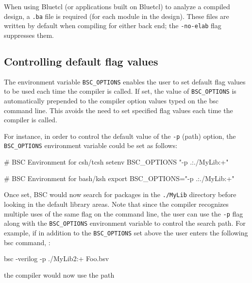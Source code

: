 \documentclass{article}
\newcommand{\te}[1]{\texttt{#1}}
\newenvironment{centerboxverbatim}
  {\center
   \boxedverbatim}
  {\endboxedverbatim
  {\endcenter }}
\begin{document}
When using Bluetcl (or applications built on Bluetcl) to analyze a compiled
design, a \te{.ba} file is required (for each module in the design).
These files are written by default when compiling for either back end;
the \te{-no-elab} flag suppresses them.



\subsection{Controlling default flag values}
\index{BSC\_OPTIONS@\te{BSC\_OPTIONS}}

The environment variable \te{BSC\_OPTIONS} enables the user to set
default flag values to be used each time the compiler is called.  If
set, the value of \te{BSC\_OPTIONS} is automatically  prepended to the
compiler option values  typed on the bsc command line.  This avoids
the need to set specified flag values each time the compiler is called.


For instance, in order to control the default value of the \te{-p} (path)
option, the \te{BSC\_OPTIONS} environment variable could be set as follows:

\begin{centerboxverbatim}
# BSC Environment for csh/tcsh
setenv BSC_OPTIONS "-p .:./MyLib:+"

# BSC Environment for bash/ksh
export BSC_OPTIONS="-p .:./MyLib:+"
\end{centerboxverbatim}


Once set, BSC would now search for packages in the
\te{./MyLib} directory before looking in the default library
areas. Note that since the compiler  recognizes multiple uses of
the same flag on the command line, the user can use the \te{-p}
flag along with  the \te{BSC\_OPTIONS} environment variable to control
the search path. For example, if in addition to the \te{BSC\_OPTIONS}
set above the user enters the following bsc
command, :

\begin{centerboxverbatim}
    bsc -verilog -p ./MyLib2:+ Foo.bsv
\end{centerboxverbatim}

the compiler would now use the path
\end{document}
